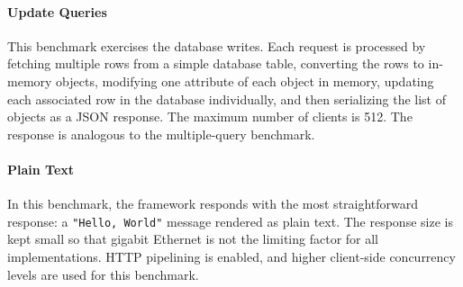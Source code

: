 
\paragraph{Update Queries}
This benchmark exercises the database writes.
Each request is processed by fetching multiple rows from a simple database table, converting the rows to in-memory objects, modifying one attribute of each object in memory, updating each associated row in the database individually, and then serializing the list of objects as a JSON response.
The maximum number of clients is 512.
The response is analogous to the multiple-query benchmark.

\paragraph{Plain Text}
In this benchmark, the framework responds with the most straightforward response: a \texttt{"Hello, World"} message rendered as plain text.
The response size is kept small so that gigabit Ethernet is not the limiting factor for all implementations.
HTTP pipelining is enabled, and higher client-side concurrency levels are used for this benchmark.

